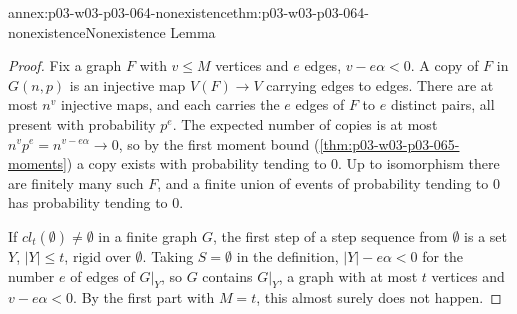 \begin{annexitem}{annex:p03-w03-p03-064-nonexistence}{thm:p03-w03-p03-064-nonexistence}{Nonexistence Lemma}
\begin{proof}
Fix a graph \(F\) with \(v\leq M\) vertices and \(e\) edges, \(v-e\alpha<0\).
A copy of \(F\) in \(G(n,p)\) is an injective map \(V(F)\to V\) carrying
edges to edges.  There are at most \(n^v\) injective maps, and each carries
the \(e\) edges of \(F\) to \(e\) distinct pairs, all present with
probability \(p^e\).  The expected number of copies is at most
\(n^vp^e=n^{v-e\alpha}\to0\), so by the first moment bound
(\cref{thm:p03-w03-p03-065-moments}) a copy exists with probability tending
to \(0\).  Up to isomorphism there are finitely many such \(F\), and a finite
union of events of probability tending to \(0\) has probability tending to
\(0\).

If \(cl_t(\emptyset)\neq\emptyset\) in a finite graph \(G\), the first step
of a step sequence from \(\emptyset\) is a set \(Y\), \(|Y|\leq t\), rigid over
\(\emptyset\).  Taking \(S=\emptyset\) in the definition, \(|Y|-e\alpha<0\)
for the number \(e\) of edges of \(G|_Y\), so \(G\) contains \(G|_Y\), a graph
with at most \(t\) vertices and \(v-e\alpha<0\).  By the first part with
\(M=t\), this almost surely does not happen.
\end{proof}
\end{annexitem}


